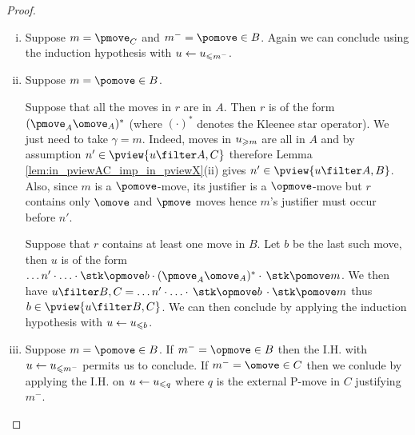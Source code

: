 \begin{proof}
\begin{enumerate}[i.]
\item Suppose $m = \pmove_C$ and $m^- = \pomove \in B$.
Again we can conclude using 
the induction hypothesis with $u \leftarrow u_{\leqslant m^-}$.

\item Suppose $m = \pomove \in B$.

Suppose that all the moves in $r$ are in $A$.
Then $r$ is of the form $(\pmove_A \omove_A)^*$ (where $(\cdot)^*$ denotes the Kleenee star operator). 
We just need to take $\gamma = m$. 
Indeed, moves in $u_{\geqslant m}$ are all in $A$
and by assumption $n'\in\pview{u\filter A,C}$  therefore
Lemma \ref{lem:in_pviewAC_imp_in_pviewX}(ii) gives
$n'\in\pview{u\filter A,B}$.
Also, since $m$ is a $\pomove$-move, 
its justifier is a $\opmove$-move but $r$ contains only $\omove$ and $\pmove$ moves hence $m$'s justifier must occur before $n'$.

Suppose that $r$ contains at least one move in $B$. Let $b$ be the last such move, then $u$ is of the form $\ldots n' \cdot \ldots \cdot \stk\opmove  b \cdot (\pmove_A \omove_A)^* \cdot\thinspace\stk\pomove m $. We then have
$u\filter B,C = \ldots n' \cdot \ldots \cdot 
\thinspace\stk\opmove b \thinspace\cdot \stk\pomove m $ thus $b \in \pview{u\filter B,C}$. We can then conclude by applying the induction hypothesis with $u \leftarrow u_{\leqslant b}$.

\item Suppose $m = \pomove \in B$.
If $m^- = \opmove \in B$ then the I.H. with $u \leftarrow u_{\leqslant m^-}$ permits us to conclude.
If $m^- = \omove \in C$ then we conlude by applying  the I.H. on $u \leftarrow u_{\leqslant q}$ where $q$ is the external P-move in $C$ justifying
$m^-$.
\end{enumerate}
\end{proof}

